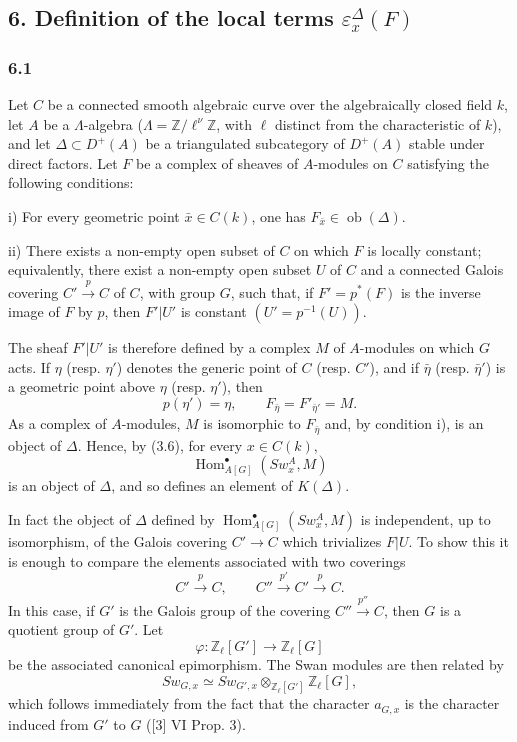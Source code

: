 \documentclass[11pt]{article}
\DeclareMathOperator{\Hom}{Hom}
\providecommand{\Ob}{\operatorname{ob}}
\providecommand{\Hom}{\operatorname{Hom}}
\providecommand{\Ob}{\operatorname{ob}}
\providecommand{\Ob}{\operatorname{Ob}}
\providecommand{\Hom}{\operatorname{Hom}}
\providecommand{\Ob}{\operatorname{ob}}
\providecommand{\Ob}{\operatorname{Ob}}
\begin{document}
\subsection*{6. Definition of the local terms $\varepsilon_x^\Delta(F)$}

\subsubsection*{6.1}

Let $C$ be a connected smooth algebraic curve over the algebraically closed field $k$, let $A$ be a $\Lambda$-algebra ($\Lambda=\mathbb Z/\ell^\nu\mathbb Z$, with $\ell$ distinct from the characteristic of $k$), and let $\Delta\subset D^+(A)$ be a triangulated subcategory of $D^+(A)$ stable under direct factors. Let $F$ be a complex of sheaves of $A$-modules on $C$ satisfying the following conditions:

i) For every geometric point $\bar x\in C(k)$, one has $F_{\bar x}\in\Ob(\Delta)$.

ii) There exists a non-empty open subset of $C$ on which $F$ is locally constant; equivalently, there exist a non-empty open subset $U$ of $C$ and a connected Galois covering $C'\xrightarrow{p}C$ of $C$, with group $G$, such that, if $F'=p^*(F)$ is the inverse image of $F$ by $p$, then $F'|U'$ is constant $(U'=p^{-1}(U))$.

The sheaf $F'|U'$ is therefore defined by a complex $M$ of $A$-modules on which $G$ acts. If $\eta$ (resp. $\eta'$) denotes the generic point of $C$ (resp. $C'$), and if $\bar\eta$ (resp. $\bar\eta'$) is a geometric point above $\eta$ (resp. $\eta'$), then
\[
p(\eta')=\eta,\qquad
F_{\bar\eta}=F'_{\bar\eta'}=M.
\tag{6.1.1}
\]
As a complex of $A$-modules, $M$ is isomorphic to $F_{\bar\eta}$ and, by condition i), is an object of $\Delta$. Hence, by (3.6), for every $x\in C(k)$,
\[
\Hom^\bullet_{A[G]}(Sw_x^A,M)
\]
is an object of $\Delta$, and so defines an element of $K(\Delta)$.

In fact the object of $\Delta$ defined by $\Hom^\bullet_{A[G]}(Sw_x^A,M)$ is independent, up to isomorphism, of the Galois covering $C'\to C$ which trivializes $F|U$. To show this it is enough to compare the elements associated with two coverings
\[
C'\xrightarrow{p}C,\qquad C''\xrightarrow{p'}C'\xrightarrow{p}C.
\]
In this case, if $G'$ is the Galois group of the covering $C''\xrightarrow{p''}C$, then $G$ is a quotient group of $G'$. Let
\[
\varphi:\mathbb Z_\ell[G']\longrightarrow \mathbb Z_\ell[G]
\]
be the associated canonical epimorphism. The Swan modules are then related by
\[
Sw_{G,x}\simeq Sw_{G',x}\otimes_{\mathbb Z_\ell[G']}\mathbb Z_\ell[G],
\]
which follows immediately from the fact that the character $a_{G,x}$ is the character induced from $G'$ to $G$ ([3] VI Prop. 3).
\end{document}
